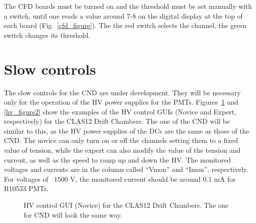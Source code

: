 \documentclass[12pt]{article}
\begin{document}
The CFD boards must be turned on and the threshold must be set manually with a switch, until one reads a value around 7-8 on the digital display at the top of each board (Fig.~\ref{cfd_figure}). The the red switch selects the channel, the green switch changes its threshold.

\section{Slow controls}

The slow controls for the CND are under development. They will be necessary only for the operation of the HV power supplies for the PMTs. Figures~\ref{hv_figure1} and \ref{hv_figure2} show the examples of the HV control GUIs (Novice and Expert, respectively) for the CLAS12 Drift Chambers. The one of the CND will be similar to this, as the HV power supplies of the DCs are the same as those of the CND. The novice can only turn on or off the channels setting them to a fixed value of tension, while the expert can also modify the value of the tension and current, as well as the speed to ramp up and down the HV. 
The monitored voltages and currents are in the column called ``Vmon'' and ``Imon'', respectively. For voltages of ~1500 V, the monitored current should be around 0.1 mA for R10533 PMTs.

\begin{figure}
\begin{center}
\caption {HV control GUI (Novice) for the CLAS12 Drift Chambers. The one for CND will look the same way. }
\label{hv_figure1}
\end{center}
\end{figure}
\end{document}
